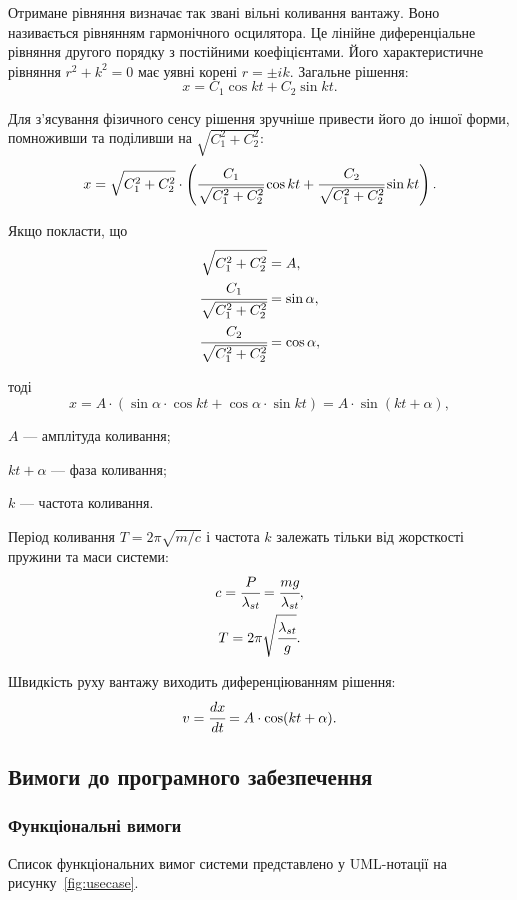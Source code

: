 Отримане рівняння визначає так звані вільні коливання вантажу.
Воно називається рівнянням гармонічного осцилятора.
Це лінійне диференціальне рівняння другого порядку з постійними коефіцієнтами.
Його характеристичне рівняння $r^2 + k^2 = 0$ має уявні корені $r=\pm ik$.
Загальне рішення:
\[
x = C_1 \cos kt + C_2 \sin kt.
\]

Для з'ясування фізичного сенсу рішення зручніше привести його до іншої форми, помноживши та поділивши на $\sqrt{C_1^2 + C_2^2}$:
\[
x = \sqrt{C_1^2 + C_2^2} \cdot \left( \cfrac{C_1}{\sqrt{C_1^2 + C_2^2}} \cos kt + \cfrac{C_2}{\sqrt{C_1^2 + C_2^2}} \sin kt \right).
\]

Якщо покласти, що
\begin{align*}
\sqrt{C_1^2 + C_2^2} &= A, \\
\cfrac{C_1}{\sqrt{C_1^2 + C_2^2}} &= \sin \alpha, \\
\cfrac{C_2}{\sqrt{C_1^2 + C_2^2}} &= \cos \alpha,
\end{align*}

тоді
\[
x = A \cdot (\sin\alpha \cdot \cos kt + \cos\alpha \cdot \sin kt) = A \cdot \sin (kt + \alpha),
\]
\begin{description}
\item[де] $A$ --- амплітуда коливання;
\item $kt + \alpha$ --- фаза коливання;
\item $k$ --- частота коливання.
\end{description}

Період коливання $T=2\pi\sqrt{m/c}$ і частота $k$ залежать тільки від жорсткості пружини та маси системи:
\begin{gather*}
c = \cfrac{P}{\lambda_{st}} = \cfrac{mg}{\lambda_{st}}, \\
T = 2\pi \sqrt{\cfrac{\lambda_{st}}{g}}.
\end{gather*}

Швидкість руху вантажу виходить диференціюванням рішення:
\[
v=\cfrac{dx}{dt}=A\cdot\cos(kt+\alpha).
\]

\subsection{Вимоги до програмного забезпечення}
\subsubsection{Функціональні вимоги}
Список функціональних вимог системи представлено у UML-нотації на рисунку~\ref{fig:usecase}.

